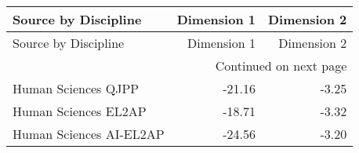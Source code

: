 \begin{longtable}{lrr}
\toprule
Source by Discipline & Dimension 1 & Dimension 2 \\
\midrule
\endfirsthead
\toprule
Source by Discipline & Dimension 1 & Dimension 2 \\
\midrule
\endhead
\midrule
\multicolumn{3}{r}{Continued on next page} \\
\midrule
\endfoot
\bottomrule
\endlastfoot
Human Sciences QJPP & -21.16 & -3.25 \\
Human Sciences EL2AP & -18.71 & -3.32 \\
Human Sciences AI-EL2AP & -24.56 & -3.20 \\
\end{longtable}

